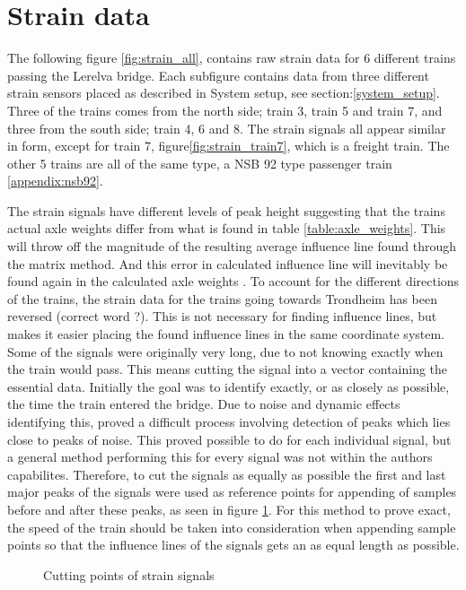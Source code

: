 \section{Strain data}
The following figure \ref{fig:strain_all}, contains raw strain data for 6 different trains passing the Lerelva bridge. Each subfigure contains data from three different strain sensors placed as described in System setup, see section:\ref{system_setup}. Three of the trains comes from the north side; train 3, train 5 and train 7, and three from the south side; train 4, 6 and 8. The strain signals all appear similar in form, except for train 7, figure\ref{fig:strain_train7}, which is a freight train. The other 5 trains are all of the same type, a NSB 92 type passenger train \ref{appendix:nsb92}.

The strain signals have different levels of peak height suggesting that the trains actual axle weights differ from what is found in table \ref{table:axle_weights}. This will throw off the magnitude of the resulting average influence line found through the matrix method. And this error in calculated influence line will inevitably be found again in the calculated axle weights \label{peaks_heights}.
To account for the different directions of the trains, the strain data for the trains going towards Trondheim has been reversed (correct word ?). This is not necessary for finding influence lines, but makes it easier placing the found influence lines in the same coordinate system.
Some of the signals were originally very long, due to not knowing exactly when the train would pass. This means cutting the signal into a vector containing the essential data. Initially the goal was to identify exactly, or as closely as possible, the time the train entered the bridge. Due to noise and dynamic effects identifying this, proved a difficult process involving detection of peaks which lies close to peaks of noise. This proved possible to do for each individual signal, but a general method performing this for every signal was not within the authors capabilites. Therefore, to cut the signals as equally as possible the first and last major peaks of the signals were used as reference points for appending of samples before and after these peaks, as seen in figure \ref{fig:cutting_points}. For this method to prove exact, the speed of the train should be taken into consideration when appending sample points so that the influence lines of the signals gets an as equal length as possible.
\begin{figure}[H]
	\begin{adjustbox}{center}
		
	\end{adjustbox}
	\caption{Cutting points of strain signals}
	\label{fig:cutting_points}
\end{figure}

